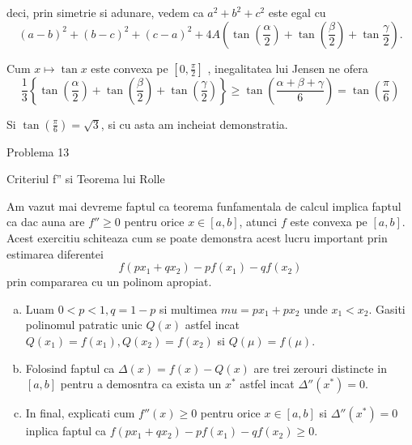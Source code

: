 \documentclass[a4paper,12pt,oneside]{report}
\begin{document}
deci, prin simetrie si adunare, vedem ca 
\(a^{2} + b^{2} + c^{2}\) este egal cu 
\begin{displaymath}
  \left ( a - b  \right )^{2} + \left ( b - c \right )^{2} + \left ( c - a  \right )^{2} + 4A\left ( \tan\left ( \frac{\alpha }{2} \right ) + \tan\left ( \frac{\beta }{2} \right ) + \tan \frac{\gamma }{2} \right ).
\end{displaymath}

	Cum \(x \mapsto \tan x\) este convexa pe \(\left [ 0 , \frac{\pi }{2} \right ]\) , inegalitatea lui Jensen ne ofera
\begin{displaymath}
  \frac{1}{3}\left \{ \tan \left ( \frac{\alpha }{2} \right ) + \tan \left ( \frac{\beta }{2} \right )  + \tan \left ( \frac{\gamma }{2} \right )\right \} \geq  \tan\left ( \frac{\alpha  + \beta  + \gamma }{6} \right ) = \tan \left ( \frac{\pi }{6} \right ) 
\end{displaymath}

Si \(\tan \left ( \frac{\pi }{6} \right ) = \sqrt{3}\), si cu asta am incheiat demonstratia. 

Problema 13

	Criteriul {f}'' si Teorema lui Rolle
	
Am vazut mai devreme faptul ca teorema funfamentala de calcul implica faptul ca dac auna are \({f}'' \geq 0\) pentru orice \(x\in \left [ a,b \right ]\), atunci \(f\) este convexa pe \(\left [ a,b \right ]\). Acest exercitiu schiteaza cum se poate demonstra acest lucru important prin estimarea diferentei 
\begin{displaymath}
  f\left ( px_{1} + qx_{2}\right ) - pf\left ( x_{1} \right ) - qf\left ( x_{2} \right )
\end{displaymath}
 prin compararea cu un polinom apropiat. 
 \begin{enumerate}[a)]
\item Luam \(0< p < 1, q = 1-p\) si multimea \(mu = px_{1} + px_{2}\) unde \(x_{1} < x_{2}\).  Gasiti polinomul patratic unic \(Q\left ( x \right )\) astfel incat  \(Q\left ( x_{1} \right ) = f\left ( x_{1} \right ), Q\left ( x_{2} \right ) = f\left ( x_{2} \right )\) si \(Q\left ( \mu  \right ) = f\left ( \mu  \right )\). 
\item Folosind faptul ca \(\Delta \left ( x \right ) =  f\left ( x \right ) - Q\left ( x \right )\) are trei zerouri distincte in \(\left [ a,b \right ]\) pentru a demosntra ca exista un \(x^{*}\) astfel incat \({\Delta }''\left ( x^{*} \right ) = 0\).
\item In final, explicati cum \({f}''\left ( x \right ) \geq 0\) pentru orice \(x\in \left [ a,b \right ]\) si \({\Delta }''\left ( x^{*} \right ) = 0\) inplica faptul ca \(f\left ( px_{1} + qx_{2} \right ) - pf\left ( x_{1} \right ) - qf\left ( x_{2} \right ) \geq 0\). 
\end{enumerate}
\end{document}

